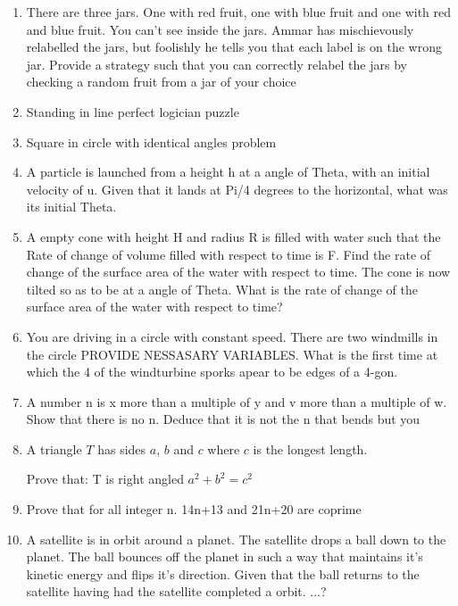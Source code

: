 \documentclass[a4paper]{article}
\begin{document}
\begin{enumerate}
\item
There are three jars. One with red fruit, one with blue fruit and one with red and blue fruit. You can’t see inside the jars. Ammar has mischievously relabelled the jars, but foolishly he tells you that each label is on the wrong jar. Provide a strategy such that you can correctly relabel the jars by checking a random fruit from a jar of your choice

\item
Standing in line perfect logician puzzle

\item
Square in circle with identical angles problem

\item
A particle is launched from a height h at a angle of Theta, with an initial velocity of u. Given that it lands at Pi/4 degrees to the horizontal, what was its initial Theta.

\item
A empty cone with height H and radius R is filled with water such that the
 Rate of change of volume filled with respect to time is F. Find the rate of change of the surface area of the water with respect to time. The cone is now tilted so as to be at a angle of Theta. What is the rate of change of the surface area of the water with respect to time?

\item
You are driving in a circle with constant speed. There are two windmills in the circle PROVIDE NESSASARY VARIABLES. What is the first time at which the 4 of the windturbine sporks apear to be edges of a 4-gon.

\item
A number n is x more than a multiple of y and v more than a multiple of w. Show that there is no n. Deduce that it is not the n that bends but you

\item
A triangle $T$ has sides $a$, $b$ and $c$ where $c$ is the longest length.

Prove that: T is right angled \iff $a^2 + b^2 = c^2$

\item
Prove that for all integer n. 14n+13 and 21n+20 are coprime

\item
A satellite is in orbit around a planet. The satellite drops a ball down to the planet. The ball bounces off the planet in such a way that maintains it’s kinetic energy and flips it’s direction. Given that the ball returns to the satellite having had the satellite completed a orbit. ...?


\end{enumerate}
\end{document}
